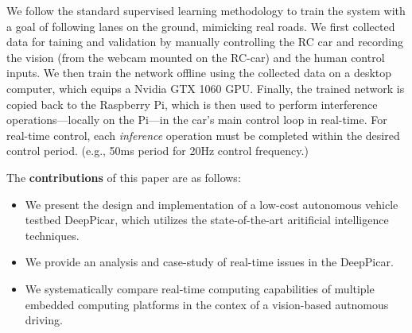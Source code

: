 We follow the standard supervised learning methodology to train the
system with a goal of following lanes on the ground, mimicking real
roads. We first collected data for taining and validation by manually 
controlling the RC car and recording the vision (from the webcam
mounted on the RC-car) and the human control inputs. We then train the
network offline using the collected data on a desktop computer, which
equips a Nvidia GTX 1060 GPU. Finally, the trained network is copied
back to the Raspberry Pi, which is then used to perform interference
operations---locally on the Pi---in the car's main control loop in
real-time. For real-time control, each \emph{inference} operation must
be completed within the desired control period. (e.g., 50ms period for
20Hz control frequency.)

The {\bf contributions} of this paper are as follows:
\begin{itemize}
  \item We present the design and implementation of a
    low-cost autonomous vehicle testbed DeepPicar, which utilizes the
    state-of-the-art aritificial intelligence techniques.
  \item We provide an analysis and case-study of real-time issues in the
    DeepPicar.
  \item We systematically compare real-time computing capabilities of
    multiple embedded computing platforms in the contex of a
    vision-based autnomous driving.
\end{itemize}



